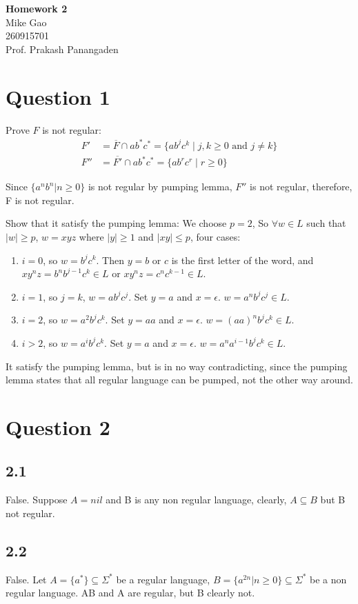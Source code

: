 \documentclass[a4paper, 11pt]{article}
\begin{document}
\noindent
\large\textbf{Homework 2} \hfill \\
\large{Mike Gao} \\
\normalsize 260915701 \\
Prof. Prakash Panangaden \hfill 


\section*{Question 1}
Prove $F$ is not regular:
\begin{align*}
  F'  & =\overline{F} \cap ab^*c^* = \{ab^jc^k\mid j,k \geq 0 \text{ and } j \neq k \} \\
  F'' & =\overline{F'} \cap ab^*c^* = \{ab^rc^r\mid r \geq 0\}
\end{align*}

Since $\{a^nb^n|n\geq 0\}$ is not regular by pumping lemma, $F''$ is not regular, therefore, F is not regular.

Show that it satisfy the pumping lemma:
We choose $p=2$, So $\forall w\in L$ such that $|w| \geq p$, $w=xyz$ where $|y|\geq 1$ and $|xy| \leq p$, four cases:
\begin{enumerate}
\item $i = 0$, so $w=b^jc^k$. Then $y=b$ or $c$ is the first letter of the word, and $xy^nz=b^nb^{j-1}c^k \in L$ or $xy^nz=c^nc^{k-1} \in L$.
\item $i = 1$, so $j=k$, $w=ab^jc^j$. Set $y=a$ and $x=\epsilon$.  $w = a^nb^jc^j\in L$.
\item $i = 2$, so $w=a^2b^jc^k$. Set $y=aa$ and $x=\epsilon$.  $w=(aa)^nb^jc^k\in L$.
\item $i > 2$, so $w=a^ib^jc^k$. Set $y=a$ and $x=\epsilon$.  $w=a^{n}a^{i-1}b^jc^k\in L$.
\end{enumerate}

It satisfy the pumping lemma, but is in no way contradicting, since the pumping lemma states that all regular language can be pumped, not the other way around.

\section*{Question 2}
\subsection*{2.1}
False. Suppose $A = nil$ and B is any non regular language, clearly, $A\subseteq B$ but B not regular.
\subsection*{2.2}
False. Let $A= \{a^*\} \subseteq \Sigma^*$ be a regular language, $B=\{a^{2n}|n\geq0\}\subseteq{\Sigma^*}$ be a non regular language. AB and A are regular, but B clearly not.
\end{document}
